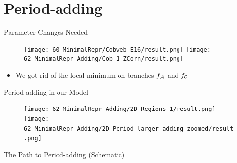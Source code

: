 \section{Period-adding}

\begin{frame}{Parameter Changes Needed}
	\vspace{-1em}
	\begin{figure}
		\texttt{[image: 60\_MinimalRepr/Cobweb\_E16/result.png]}
		\texttt{[image: 62\_MinimalRepr\_Adding/Cob\_1\_ZCorn/result.png]}
	\end{figure}
	\begin{itemize}
		\item We got rid of the local minimum on branches $f_{\mathcal{A}}$ and $f_{\mathcal{C}}$
	\end{itemize}
\end{frame}

\begin{frame}{Period-adding in our Model}
	\begin{figure}
		\texttt{[image: 62\_MinimalRepr\_Adding/2D\_Regions\_1/result.png]}
		\quad
		\texttt{[image: 62\_MinimalRepr\_Adding/2D\_Period\_larger\_adding\_zoomed/result.png]}
	\end{figure}
\end{frame}

\begin{frame}{The Path to Period-adding (Schematic)}
	\begin{figure}
	\end{figure}
\end{frame}

